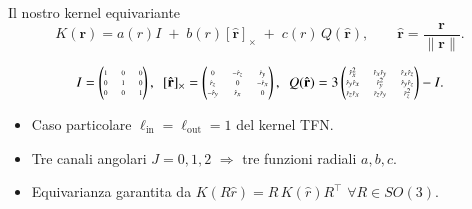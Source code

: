 \documentclass[aspectratio=32,8pt]{beamer}
\begin{document}
\begin{frame}{Il nostro kernel equivariante}
\begin{equation}\nonumber
  K(\mathbf r)=a(r)I\; +\; b(r)[\hat{\mathbf r}]_\times\; +\; c(r)\,Q(\hat{\mathbf r}),
  \qquad \hat{\mathbf r}=\frac{\mathbf r}{\lVert\mathbf r\rVert}.
\end{equation}

\hspace{-20pt}
\begin{equation}\tiny \nonumber
    \renewcommand{\arraystretch}{1.2}
I=\begin{pmatrix}1&0&0\\0&1&0\\0&0&1\end{pmatrix}, \quad
[\hat{\mathbf r}]_\times=\begin{pmatrix}0&-\hat r_z&\hat r_y\\\hat r_z&0&-\hat r_x\\-\hat r_y&\hat r_x&0\end{pmatrix}, \quad
Q(\hat{\mathbf r})=3\begin{pmatrix}
 \hat r_x^2 & \hat r_x\hat r_y & \hat r_x\hat r_z\\
 \hat r_y\hat r_x & \hat r_y^2 & \hat r_y\hat r_z\\
 \hat r_z\hat r_x & \hat r_z\hat r_y & \hat r_z^2
\end{pmatrix}-I.
\end{equation}

\vspace{0.5em}
\begin{itemize}
  \item Caso particolare \(\ell_{\text{in}}=\ell_{\text{out}}=1\) del kernel TFN.
  \item Tre canali angolari \(J=0,1,2\) \(\Rightarrow\) tre funzioni radiali \(a,b,c\).
  \item Equivarianza garantita da \(K(R\hat r)=R\,K(\hat r)R^{\!\top}\,\,\forall R\in SO(3).\)
\end{itemize}
\end{frame}
\end{document}

